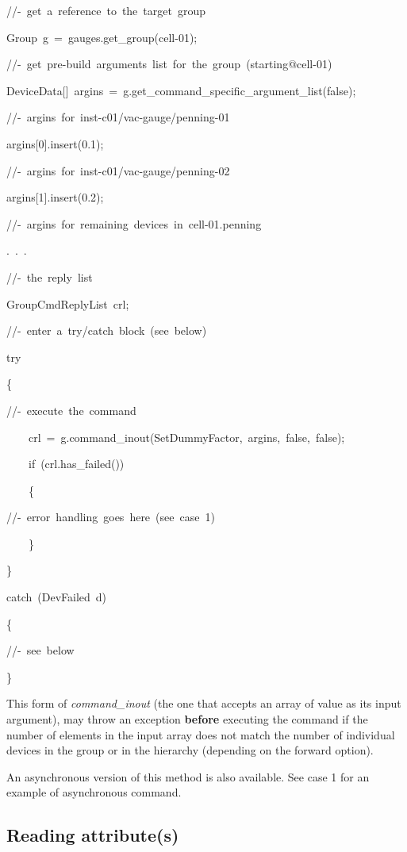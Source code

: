 
\begin{lyxcode}
//-~get~a~reference~to~the~target~group

Group~g~=~gauges.get\_group(\textquotedbl{}cell-01\textquotedbl{});

//-~get~pre-build~arguments~list~for~the~group~(starting@cell-01)

DeviceData{[}{]}~argins~=~g.get\_command\_specific\_argument\_list(false);

//-~argins~for~inst-c01/vac-gauge/penning-01

argins{[}0{]}.insert(0.1);

//-~argins~for~inst-c01/vac-gauge/penning-02

argins{[}1{]}.insert(0.2);

//-~argins~for~remaining~devices~in~cell-01.penning

.~.~.

//-~the~reply~list~

GroupCmdReplyList~crl;

//-~enter~a~try/catch~block~(see~below)

try

\{

//-~execute~the~command

~~~~crl~=~g.command\_inout(\textquotedbl{}SetDummyFactor\textquotedbl{},~argins,~false,~false);

~~~~if~(crl.has\_failed())

~~~~\{

//-~error~handling~goes~here~(see~case~1)

~~~~\}

\}

catch~(DevFailed~d)

\{

//-~see~below

\}
\end{lyxcode}


This form of \emph{command\_inout} (the one
that accepts an array of value as its input argument), may throw an
exception \textbf{before} executing the command
if the number of elements in the input array does not match the number
of individual devices in the group or in the hierarchy
(depending on the forward option). 

An asynchronous version of this method is also available. See case
1 for an example of asynchronous command.


\subsection{Reading attribute(s)\label{sub:Read-attr} }

